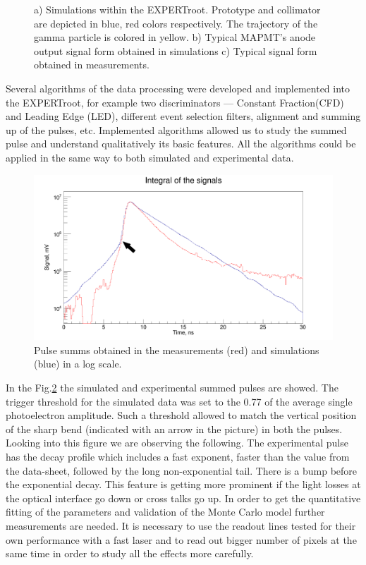 \documentclass{webofc}
\newcommand{\er}{\textmd{EXPERTroot}}
\begin{document}
\begin{figure}[h]
\begin{minipage}[h]{0.35\linewidth}
	\end{minipage}
	\caption{a) Simulations within the \er. Prototype and collimator are depicted in blue, red colors respectively. The trajectory of the gamma particle is colored in yellow. b) Typical MAPMT's anode output signal form obtained in simulations c) Typical signal form obtained in measurements.}
	\label{ris:sim}
\end{figure}

Several algorithms of the data processing were developed and implemented into the \er, for example two discriminators --- Constant Fraction(CFD) and Leading Edge (LED), different event selection filters, alignment and summing up of the pulses, etc. Implemented algorithms allowed us to study the summed pulse and understand qualitatively its basic features. All the algorithms could be applied in the same way to both simulated and experimental data.

\begin{figure}
	\includegraphics[width=\linewidth]{sum1.png}
	\caption{Pulse summs obtained in the measurements (red) and simulations (blue) in a log scale.}\label{ris:sum}
\end{figure}

In the Fig.\ref{ris:sum} the simulated and experimental summed pulses are showed. The trigger threshold for the simulated data was set to the 0.77 of the average single photoelectron amplitude.
Such a threshold allowed to match the vertical position of the sharp bend (indicated with an arrow in the picture) in both the pulses. Looking into this figure we are observing the following. The experimental pulse has  the decay profile which includes a fast exponent, faster than the value from the data-sheet, followed by the long non-exponential tail. There is a bump before the exponential decay. This feature is getting more prominent if the light losses at the optical interface go down or cross talks go up.  In order to get the quantitative fitting of the parameters and validation of the Monte Carlo model further measurements are needed. It is necessary to use the readout lines tested for their own performance with a fast laser and to read out bigger number of pixels at the same time in order to study all the effects more carefully.
\end{document}

